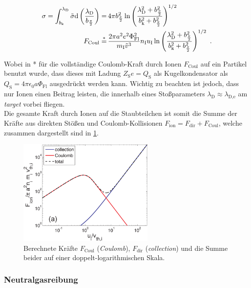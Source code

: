 \documentclass[numbers=noenddot,a4paper]{scrartcl}
\newcommand{\diff}{\textnormal{d}}
\newcommand{\ix}[1]{_\text{#1}}
\newcommand{\tilt}[1]{\textit{#1}}
\begin{document}
					\begin{align}
						\sigma=\int_{b\ix{k}}^{\lambda\ix{D}}\tilde{\sigma}\diff\left(\frac{\lambda\ix{D}}{b_{\frac{\pi}{2}}}\right)=&\,4\pi b_{\frac{\pi}{2}}^2\ln\left(\frac{\lambda\ix{D}^2+b_{\frac{\pi}{2}}^2}{b\ix{k}^2+b_{\frac{\pi}{2}}^2}\right)^{1/2} \nonumber \\
						F\ix{Coul}\overset{*}{=}&\,\frac{2\pi a^2 e^2\Phi\ix{Fl}^2}{m\ix{I}\tilde{v}^3}n\ix{I}u\ix{I}\ln\left(\frac{\lambda\ix{D}^2+b_{\frac{\pi}{2}}^2}{b\ix{k}^2+b_{\frac{\pi}{2}}^2}\right)^{1/2} \, \, .
					\end{align}
					
				Wobei in * für die vollständige Coulomb-Kraft durch Ionen $F\ix{Coul}$ auf ein Partikel benutzt wurde, dass dieses mit Ladung $Z\ix{S}e=Q\ix{S}$ als Kugelkondensator als $Q\ix{S}=4\pi\epsilon\ix{0}a\Phi\ix{Fl}$ ausgedrückt werden kann. Wichtig zu beachten ist jedoch, dass nur Ionen einen Beitrag leisten, die innerhalb eines Stoßparameters $\lambda\ix{D}\approx\lambda\ix{D,e}$ am \tilt{target} vorbei fliegen.\\
				Die gesamte Kraft durch Ionen auf die Staubteilchen ist somit die Summe der Kräfte aus direkten Stößen und Coulomb-Kollisionen $F\ix{ion}=F\ix{dir}+F\ix{Coul}$, welche zusammen dargestellt sind in \ref{img:ionkräfte}.
				
					\begin{figure}
						\centering
						\includegraphics[height=0.4\textwidth,width=0.6\textwidth]{figs/forcesandtrappingmelzer.png}
						\caption{Berechnete Kräfte $F\ix{Coul}$ (\tilt{Coulomb}), $F\ix{dir}$ (\tilt{collection}) und die Summe beider auf einer doppelt-logarithmischen Skala.}\label{img:ionkräfte}
					\end{figure}
					
			\subsubsection{Neutralgasreibung}
			
\end{document}
